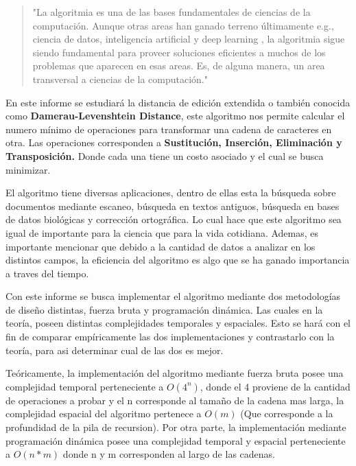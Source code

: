 \begin{comment}
\begin{mdframed}
Recuerde que este es su trabajo, y sólo usted puede expresar con precisión lo que ha aprendido y quiere transmitir. Si lo hace bien, su introducción será más significativa y valiosa que cualquier texto automatizado. ¡Confíe en sus habilidades, y verá que puede hacer un mejor trabajo que cualquier herramienta que automatiza la generación de texto!
\end{mdframed}
\end{comment}

\begin{quote}
"La algoritmia es una de las
bases fundamentales de ciencias de la computación. Aunque otras areas
han ganado terreno últimamente e.g., ciencia de datos, inteligencia
artificial y deep learning , la algoritmia sigue siendo fundamental para
proveer soluciones eficientes a muchos de los problemas que aparecen
en esas areas. Es, de alguna manera, un area transversal a ciencias de
la computación."
\end{quote} \cite{algoritmos_discretos}


En este informe se estudiará la distancia de edición 
extendida o también conocida como
\textbf{Damerau-Levenshtein Distance}, este algoritmo nos permite
calcular el numero mínimo de operaciones para transformar una cadena
de caracteres en otra. Las operaciones corresponden a \textbf{Sustitución,
Inserción, Eliminación y Transposición.} Donde cada una tiene un costo
asociado y el cual se busca minimizar.

El algoritmo tiene diversas aplicaciones, dentro de ellas esta
la búsqueda sobre documentos mediante escaneo, búsqueda en textos antiguos,
búsqueda en bases de datos biológicas y corrección ortográfica. Lo cual
hace que este algoritmo sea igual de importante para la ciencia que para
la vida cotidiana. Ademas, es importante mencionar que debido a la cantidad
de datos a analizar en los distintos campos, la eficiencia del algoritmo
es algo que se ha ganado importancia a traves del tiempo.
\cite{algoritmos_discretos}

Con este informe se busca implementar el algoritmo mediante dos metodologías
de diseño distintas, fuerza bruta y programación dinámica. Las cuales en la
teoría, poseen distintas complejidades temporales y espaciales. Esto se hará
con el fin de comparar empíricamente las dos implementaciones y 
contrastarlo con la teoría, para asi determinar cual de las dos es mejor.

Teóricamente, la implementación del algoritmo mediante fuerza bruta 
posee una complejidad temporal perteneciente a \( O(4^n) \), donde el 4 proviene
de la cantidad de operaciones a probar y el n corresponde al tamaño de la cadena mas larga, la complejidad
espacial del algoritmo pertenece a \( O(m) \) (Que corresponde a la profundidad de la pila
de recursion). Por otra parte, la implementación mediante programación dinámica
posee una complejidad temporal y espacial perteneciente a \( O(n*m) \) donde n y m corresponden
al largo de las cadenas.

